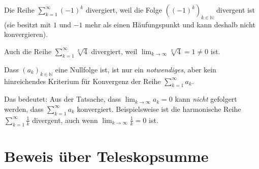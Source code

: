 \documentclass[fontsize=9pt,
               parskip=half-,
               DIV=14,
               listof=chapterentry,
               tocflat]{scrbook}
\begin{document}
\begin{example*}[Trivialkriterium]
Die Reihe $\sum _{k=1}^{\infty }(-1)^{k}$ divergiert, weil die Folge $\left((-1)^{k}\right)_{k\in \mathbb {N} }$ divergent ist (sie besitzt mit $1$ und $-1$ mehr als einen Häufungspunkt und kann deshalb nicht konvergieren).

Auch die Reihe $\sum _{k=1}^{\infty }{\sqrt[{k}]{4}}$ divergiert, weil $\lim _{k\to \infty }{\sqrt[{k}]{4}}=1\neq 0$ ist.

\end{example*}

\begin{warning*}
Dass $(a_{k})_{k\in \mathbb {N} }$ eine Nullfolge ist, ist nur ein \emph{notwendiges}, aber kein hinreichendes Kriterium für Konvergenz der Reihe $\sum _{k=1}^{\infty }a_{k}$.

Das bedeutet: Aus der Tatsache, dass $\lim _{k\to \infty }a_{k}=0$ kann \emph{nicht} gefolgert werden, dass $\sum _{k=1}^{\infty }a_{k}$ konvergiert. Beispielsweise ist die harmonische Reihe $\sum _{k=1}^{\infty }{\frac {1}{k}}$ divergent, auch wenn $\lim _{k\to \infty }{\tfrac {1}{k}}=0$ ist.

\end{warning*}

\section{Beweis über Teleskopsumme}
\end{document}
